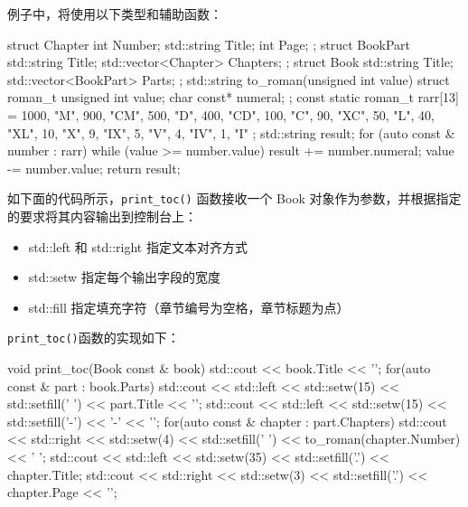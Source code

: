例子中，将使用以下类型和辅助函数：

\begin{cpp}
struct Chapter
{
    int Number;
    std::string Title;
    int Page;
};
struct BookPart
{
    std::string Title;
    std::vector<Chapter> Chapters;
};
struct Book
{
    std::string Title;
    std::vector<BookPart> Parts;
};
std::string to_roman(unsigned int value)
{
    struct roman_t { unsigned int value; char const* numeral; };
    const static roman_t rarr[13] =
    {
        {1000, "M"}, {900, "CM"}, {500, "D"}, {400, "CD"},
        { 100, "C"}, { 90, "XC"}, { 50, "L"}, { 40, "XL"},
        {  10, "X"}, {  9, "IX"}, {  5, "V"}, {  4, "IV"},
        {   1, "I"}
    };
    std::string result;
    for (auto const & number : rarr)
    {
        while (value >= number.value)
        {
            result += number.numeral;
            value -= number.value;
        }
    }
    return result;
}
\end{cpp}

如下面的代码所示，\verb|print_toc()| 函数接收一个 Book 对象作为参数，并根据指定的要求将其内容输出到控制台上：

\begin{itemize}
\item
std::left 和 std::right 指定文本对齐方式

\item
std::setw 指定每个输出字段的宽度

\item
std::fill 指定填充字符（章节编号为空格，章节标题为点）
\end{itemize}

\verb|print_toc()|函数的实现如下：

\begin{cpp}
void print_toc(Book const & book)
{
    std::cout << book.Title << '\n';
    for(auto const & part : book.Parts)
    {
        std::cout << std::left << std::setw(15) << std::setfill(' ')
                  << part.Title << '\n';
        std::cout << std::left << std::setw(15) << std::setfill('-')
                  << '-' << '\n';
        for(auto const & chapter : part.Chapters)
        {
            std::cout << std::right << std::setw(4) << std::setfill(' ')
                      << to_roman(chapter.Number) << ' ';
            std::cout << std::left << std::setw(35) << std::setfill('.')
                      << chapter.Title;
            std::cout << std::right << std::setw(3) << std::setfill('.')
                      << chapter.Page << '\n';
        }
    }
}
\end{cpp}

